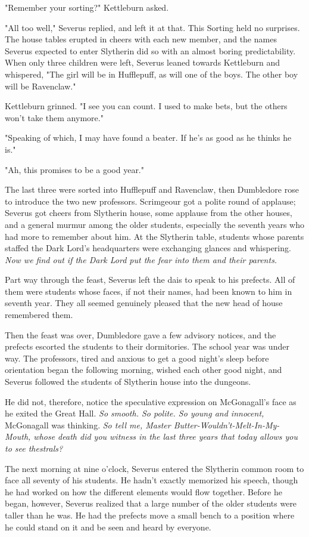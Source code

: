 "Remember your sorting?" Kettleburn asked.

"All too well," Severus replied, and left it at that. This Sorting held no surprises. The house tables erupted in cheers with each new member, and the names Severus expected to enter Slytherin did so with an almost boring predictability. When only three children were left, Severus leaned towards Kettleburn and whispered, "The girl will be in Hufflepuff, as will one of the boys. The other boy will be Ravenclaw."

Kettleburn grinned. "I see you can count. I used to make bets, but the others won't take them anymore."

"Speaking of which, I may have found a beater. If he's as good as he thinks he is."

"Ah, this promises to be a good year."

The last three were sorted into Hufflepuff and Ravenclaw, then Dumbledore rose to introduce the two new professors. Scrimgeour got a polite round of applause; Severus got cheers from Slytherin house, some applause from the other houses, and a general murmur among the older students, especially the seventh years who had more to remember about him. At the Slytherin table, students whose parents staffed the Dark Lord's headquarters were exchanging glances and whispering. \emph{Now we find out if the Dark Lord put the fear into them and their parents.}

Part way through the feast, Severus left the dais to speak to his prefects. All of them were students whose faces, if not their names, had been known to him in seventh year. They all seemed genuinely pleased that the new head of house remembered them.

Then the feast was over, Dumbledore gave a few advisory notices, and the prefects escorted the students to their dormitories. The school year was under way. The professors, tired and anxious to get a good night's sleep before orientation began the following morning, wished each other good night, and Severus followed the students of Slytherin house into the dungeons.

He did not, therefore, notice the speculative expression on McGonagall's face as he exited the Great Hall. \emph{So smooth. So polite. So young and innocent,} McGonagall was thinking. \emph{So tell me, Master Butter-Wouldn't-Melt-In-My-Mouth, whose death did you witness in the last three years that today allows you to see thestrals?}

The next morning at nine o'clock, Severus entered the Slytherin common room to face all seventy of his students. He hadn't exactly memorized his speech, though he had worked on how the different elements would flow together. Before he began, however, Severus realized that a large number of the older students were taller than he was. He had the prefects move a small bench to a position where he could stand on it and be seen and heard by everyone.

